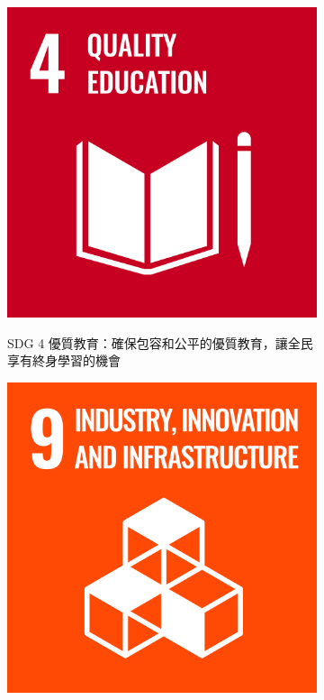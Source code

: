 \documentclass[12pt]{article}
\begin{document}
\begin{figure}[H]
  \centering
  \begin{subfigure}{0.4\linewidth}
    \centering
    \href{https://raw.githubusercontent.com/programingtw/proglearn-plan/main/2023全國大專校院智慧創新暨跨域整合創作競賽/img/E_SDG_PRINT-04.jpg}{ 
      \includegraphics[width=1\textwidth]{./img/E_SDG_PRINT-04.jpg}
    }
    \caption{SDG 4 優質教育：確保包容和公平的優質教育，讓全民享有終身學習的機會}
  \end{subfigure}
  \label{arc1}
  \begin{subfigure}{0.4\linewidth}
    \centering
    \href{https://raw.githubusercontent.com/programingtw/proglearn-plan/main/2023全國大專校院智慧創新暨跨域整合創作競賽/img/E_SDG_PRINT-09.jpg}{ 
      \includegraphics[width=1\textwidth]{./img/E_SDG_PRINT-09.jpg}
}
\end{subfigure}
\end{figure}
\end{document}
